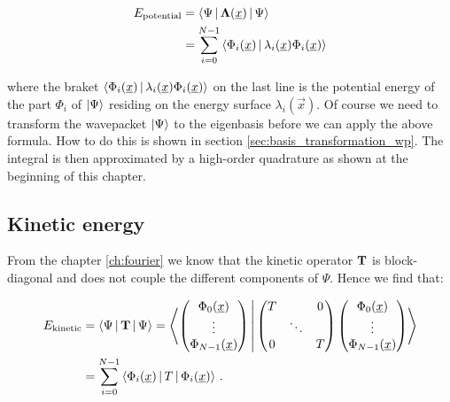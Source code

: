 \begin{align}
  E_{\text{potential}} & = \Braket{\Psi|\mat{\Lambda}(\vec{x})|\Psi} \nonumber\\
                       & = \sum_{i=0}^{N-1} \Braket{ \Phi_i(\vec{x}) | \lambda_{i}(\vec{x}) \Phi_i(\vec{x}) }
\end{align}

where the braket $\Braket{ \Phi_i(\vec{x}) | \lambda_{i}(\vec{x}) \Phi_i(\vec{x}) }$ on the
last line is the potential energy of the part $\Phi_i$ of $\Ket{\Psi}$ residing
on the energy surface $\lambda_i(\vec{x})$. Of course we need to transform the
wavepacket $\Ket{\Psi}$ to the eigenbasis before we can apply the above formula.
How to do this is shown in section \ref{sec:basis_transformation_wp}. The integral
is then approximated by a high-order quadrature as shown at the beginning of this chapter.


\subsection{Kinetic energy}


From the chapter \ref{ch:fourier} we know that the kinetic operator $\mat{T}$ is block-diagonal
and does not couple the different components of $\Psi$. Hence we find that:

\begin{align*}
  E_{\text{kinetic}} & = \Braket{\Psi| \mat{T} |\Psi}
  = \Braket{
    \begin{pmatrix}
      \Phi_0(\vec{x}) \\
      \vdots \\
      \Phi_{N-1}(\vec{x}) \\
    \end{pmatrix}
    |
    \begin{pmatrix}
      T  & {}     & 0 \\
      {} & \ddots & {} \\
      0  & {}     & T
    \end{pmatrix}
    \begin{pmatrix}
      \Phi_0(\vec{x}) \\
      \vdots \\
      \Phi_{N-1}(\vec{x}) \\
    \end{pmatrix}
    } \\
  & = \sum_{i=0}^{N-1} \Braket{ \Phi_i(\vec{x}) | T | \Phi_i(\vec{x}) } \,.
\end{align*}

